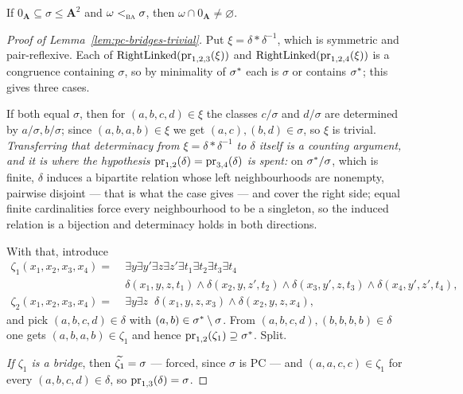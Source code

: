 \begin{lemma}\label{lem:absorbing-equality}
If $0_{\mathbf A}\subseteq\sigma\le\mathbf A^{2}$ and
$\omega<_{\textup{\textsc{ba}}}^{}\sigma$, then $\omega\cap 0_{\mathbf A}\neq\varnothing$.
\end{lemma}

\begin{proof}[Proof of Lemma~\ref{lem:pc-bridges-trivial}]
Put $\xi=\delta\ast\delta^{-1}$, which is symmetric and pair-reflexive. Each of
$\operatorname{RightLinked}(\operatorname*{pr}_{1,2,3}(\xi))$ and
$\operatorname{RightLinked}(\operatorname*{pr}_{1,2,4}(\xi))$ is a congruence containing
$\sigma$, so by minimality of $\sigma^{*}$ each is $\sigma$ or contains
$\sigma^{*}$; this gives three cases.

If both equal $\sigma$, then for $(a,b,c,d)\in\xi$ the classes $c/\sigma$ and
$d/\sigma$ are determined by $a/\sigma,b/\sigma$; since $(a,b,a,b)\in\xi$ we get
$(a,c),(b,d)\in\sigma$, so $\xi$ is trivial. \emph{Transferring that
determinacy from $\xi=\delta\ast\delta^{-1}$ to $\delta$ itself is a counting
argument, and it is where the hypothesis
$\operatorname*{pr}_{1,2}(\delta)=\operatorname*{pr}_{3,4}(\delta)$ is spent:} on
$\sigma^{*}/\sigma$, which is finite, $\delta$ induces a bipartite relation
whose left neighbourhoods are nonempty, pairwise disjoint --- that is what the
case gives --- and cover the right side; equal finite cardinalities force every
neighbourhood to be a singleton, so the induced relation is a bijection and
determinacy holds in both directions.

With that, introduce
\begin{align*}
  \zeta_{1}(x_{1},x_{2},x_{3},x_{4})=\;&
    \exists y\exists y'\exists z\exists z'
    \exists t_{1}\exists t_{2}\exists t_{3}\exists t_{4}\;\\
    &\delta(x_{1},y,z,t_{1})\wedge\delta(x_{2},y,z',t_{2})\wedge
     \delta(x_{3},y',z,t_{3})\wedge\delta(x_{4},y',z',t_{4}),\\
  \zeta_{2}(x_{1},x_{2},x_{3},x_{4})=\;&
    \exists y\exists z\;\;\delta(x_{1},y,z,x_{3})\wedge\delta(x_{2},y,z,x_{4}),
\end{align*}
and pick $(a,b,c,d)\in\delta$ with $(a,b)\in\sigma^{*}\setminus\sigma$. From
$(a,b,c,d),(b,b,b,b)\in\delta$ one gets $(a,b,a,b)\in\zeta_{1}$ and hence
$\operatorname*{pr}_{1,2}(\zeta_{1})\supseteq\sigma^{*}$. Split.

\emph{If $\zeta_{1}$ is a bridge}, then $\widetilde{\zeta_{1}}=\sigma$ --- forced,
since $\sigma$ is PC --- and $(a,a,c,c)\in\zeta_{1}$ for every
$(a,b,c,d)\in\delta$, so $\operatorname*{pr}_{1,3}(\delta)=\sigma$.


\end{proof}
